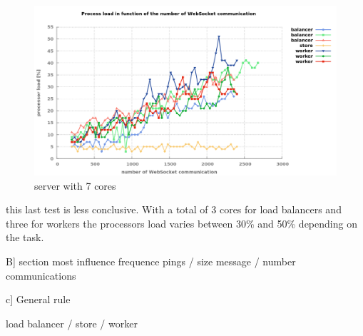 \begin{figure}[H]
	\centering
		\includegraphics[width=\textwidth]{./Figures/WS_server_3rising.png}
	\caption[WS_server_3rising]{server with 7 cores}
	\label{fig:WS_server_3rising}
\end{figure}

this last test is less conclusive. With a total of 3 cores for load balancers
and three for workers the processors load varies between 30\% and 50\%
depending on the task.

B] section most influence frequence pings / size message / number communications

c] General rule

load balancer / store / worker
